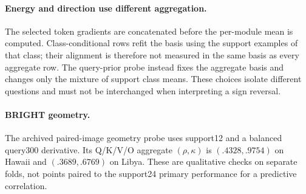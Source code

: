 \documentclass{article}
\begin{document}
\paragraph{Energy and direction use different aggregation.}
The selected token gradients are concatenated before the per-module mean is computed. Class-conditional rows refit the basis using the support examples of that class; their alignment is therefore not measured in the same basis as every aggregate row. The query-prior probe instead fixes the aggregate basis and changes only the mixture of support class means. These choices isolate different questions and must not be interchanged when interpreting a sign reversal.

\paragraph{BRIGHT geometry.}
The archived paired-image geometry probe uses support12 and a balanced query300 derivative. Its Q/K/V/O aggregate $(\rho,\kappa)$ is $(.4328,.9754)$ on Hawaii and $(.3689,.6769)$ on Libya. These are qualitative checks on separate folds, not points paired to the support24 primary performance for a predictive correlation.
\end{document}
